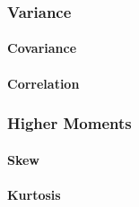 

\subsubsection{Variance}


%

\paragraph{Covariance}

\paragraph{Correlation}





\subsubsection{Higher Moments}

\paragraph{Skew}

\paragraph{Kurtosis}







